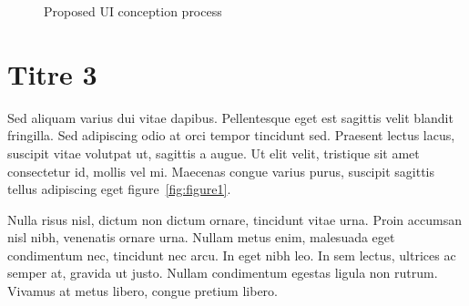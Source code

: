 \documentclass{jdt-tis}
\begin{document}
\begin{content}
\begin{figure}[H]
\centering
{}

\caption{Proposed UI conception process}
\label{fig:process3}
\end{figure}



  \section{Titre 3}
  Sed aliquam varius dui vitae dapibus. Pellentesque eget est sagittis velit blandit fringilla. Sed adipiscing odio at orci tempor tincidunt sed. Praesent lectus lacus, suscipit vitae volutpat ut, sagittis a augue. Ut elit velit, tristique sit amet consectetur id, mollis vel mi. Maecenas congue varius purus, suscipit sagittis tellus adipiscing eget figure~\ref{fig:figure1}.

  
  Nulla risus nisl, dictum non dictum ornare, tincidunt vitae urna. Proin accumsan nisl nibh, venenatis ornare urna. Nullam metus enim, malesuada eget condimentum nec, tincidunt nec arcu. In eget nibh leo. In sem lectus, ultrices ac semper at, gravida ut justo. Nullam condimentum egestas ligula non rutrum. Vivamus at metus libero, congue pretium libero. 


\end{content}
\end{document}
